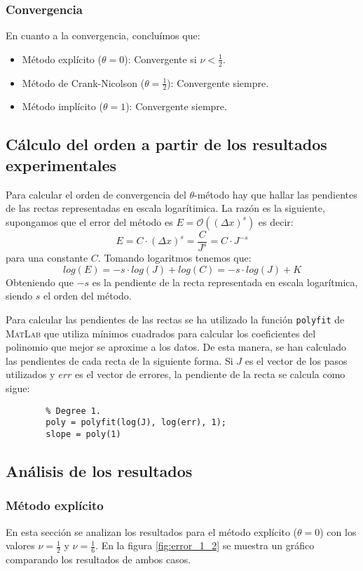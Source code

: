 \documentclass[spanish]{mathnotes}
\begin{document}
			\subsubsection{Convergencia}
			En cuanto a la convergencia, concluímos que:
			\begin{itemize}
				\item Método explícito ($\theta = 0$): Convergente si $\nu < \frac{1}{2}$.
				\item Método de Crank-Nicolson ($\theta = \frac{1}{2}$): Convergente siempre.
				\item Método implícito ($\theta = 1$): Convergente siempre.
			\end{itemize}
	
	\subsection{Cálculo del orden a partir de los resultados experimentales}
	Para calcular el orden de convergencia del $\theta$-método hay que hallar las pendientes de las rectas representadas en escala logarítimica. La razón es la siguiente, supongamos que el error del método es $E=\mathcal{O}((\Delta x)^s)$ es decir:
	$$E = C\cdot (\Delta x)^s = \frac{C}{J^s} = C\cdot J^{-s}$$ 
	para una constante $C$. Tomando logaritmos tenemos que:
	$$log(E) = -s\cdot log(J) + log(C) = -s\cdot log(J) + K$$
	Obteniendo que $-s$ es la pendiente de la recta representada en escala logarítmica, siendo $s$ el orden del método.
		
	Para calcular las pendientes de las rectas  se ha utilizado la función \texttt{polyfit} de \textsc{MatLab} que utiliza mínimos cuadrados para calcular los coeficientes del polinomio que mejor se aproxime a los datos. De esta manera, se han calculado las pendientes de cada recta de la siguiente forma. Si $J$ es el vector de los pasos utilizados y $err$ es el vector de errores, la pendiente de la recta se calcula como sigue:
	
	\begin{lstlisting}
		% Degree 1.
		poly = polyfit(log(J), log(err), 1);
		slope = poly(1)
	\end{lstlisting}
	
	\subsection{Análisis de los resultados}
	\subsubsection{Método explícito}
	En esta sección se analizan los resultados para el método explícito ($\theta = 0$) con los valores $\nu=\frac{1}{2}$ y $\nu=\frac{1}{6}$. En la figura \ref{fig:error_1_2} se muestra un gráfico comparando los resultados de ambos casos.
	
\end{document}
